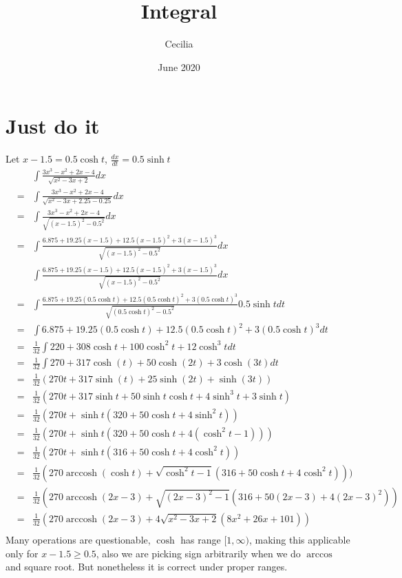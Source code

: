 \documentclass{article}
\title{Integral}
\author{Cecilia}
\date{June 2020}
\DeclareMathOperator{\arccosh}{arccosh}
\begin{document}
\maketitle
\section{Just do it}
Let $ x - 1.5 = 0.5 \cosh t $, $ \frac{dx}{dt} = 0.5 \sinh t $
\begin{eqnarray*}
  & & \int{\frac{3x^3 - x^2 + 2x - 4}{\sqrt{x^2 - 3x + 2}}dx} \\
  &=& \int{\frac{3x^3 - x^2 + 2x - 4}{\sqrt{x^2 - 3x + 2.25 - 0.25}}dx} \\
  &=& \int{\frac{3x^3 - x^2 + 2x - 4}{\sqrt{(x - 1.5)^2 - 0.5^2}}dx} \\
  &=& \int{\frac{6.875 + 19.25 (x - 1.5) + 12.5 (x - 1.5)^2 + 3 (x - 1.5)^3}{\sqrt{(x - 1.5)^2 - 0.5^2}}dx} \\
  & & \int{\frac{6.875 + 19.25 (x - 1.5) + 12.5 (x - 1.5)^2 + 3 (x - 1.5)^3}{\sqrt{(x - 1.5)^2 - 0.5^2}}dx} \\
  &=& \int{\frac{6.875 + 19.25 (0.5 \cosh t) + 12.5 (0.5 \cosh t)^2 + 3 (0.5 \cosh t)^3}{\sqrt{(0.5 \cosh t)^2 - 0.5^2}}0.5 \sinh t dt } \\
  &=& \int{6.875 + 19.25 (0.5 \cosh t) + 12.5 (0.5 \cosh t)^2 + 3 (0.5 \cosh t)^3 dt } \\
  &=& \frac{1}{32}\int{220 + 308 \cosh t + 100 \cosh^2 t + 12 \cosh^3 t dt } \\
  &=& \frac{1}{32}\int{270 + 317 \cosh(t) + 50 \cosh(2 t) + 3\cosh(3t) dt} \\
  &=& \frac{1}{32}(270t + 317 \sinh(t) + 25 \sinh(2t) + \sinh(3t)) \\
  &=& \frac{1}{32}(270t + 317 \sinh t + 50 \sinh t\cosh t + 4\sinh^3 t + 3\sinh t) \\
  &=& \frac{1}{32}(270t + \sinh t(320 + 50 \cosh t + 4\sinh^2 t)) \\
  &=& \frac{1}{32}(270t + \sinh t(320 + 50 \cosh t + 4(\cosh^2 t - 1))) \\
  &=& \frac{1}{32}(270t + \sinh t(316 + 50 \cosh t + 4\cosh^2 t)) \\
  &=& \frac{1}{32}(270\arccosh(\cosh t) + \sqrt{\cosh^2 t - 1}(316 + 50 \cosh t + 4\cosh^2 t))) \\
  &=& \frac{1}{32}(270\arccosh(2x - 3) + \sqrt{(2x - 3)^2 - 1}(316 + 50 (2x - 3) + 4(2x - 3)^2)) \\
  &=& \frac{1}{32}(270\arccosh(2x - 3) + 4\sqrt{x^2 - 3x + 2}(8x^2 + 26x + 101)) \\
\end{eqnarray*}
Many operations are questionable, $ \cosh $ has range $ [1, \infty) $, making this applicable only for $ x - 1.5 \geq 0.5 $, also we are picking sign arbitrarily when we do $ \arccos $ and square root. But nonetheless it is correct under proper ranges.
\end{document}
